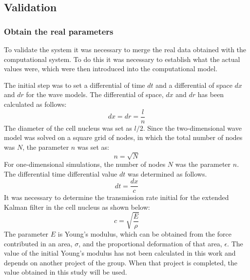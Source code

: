 \documentclass[12pt, a4paper]{article} %
\begin{document}
\setlength{\parskip}{0mm}

\subsection{Validation}

\subsubsection{Obtain the real parameters}

To validate the system it was necessary to merge the real data obtained with the computational system. To do this it was necessary to establish what the actual values were, which were then introduced into the computational model.

\setlength{\parskip}{4mm}

The initial step was to set a differential of time $dt$ and a differential of space $dx$ and $dr$ for the wave models. The differential of space, $dx$ and $dr$ has been calculated as follows:
\begin{equation} \label{eqn:dx}
	dx = dr = \frac{l}{n}
\end{equation}
The diameter of the cell nucleus was set as $l/2$. Since the two-dimensional wave model was solved on a square grid of nodes, in which the total number of nodes was $N$, the parameter $n$ was set as:
\begin{equation} \label{eqn:n}
	n = \sqrt{N}
\end{equation}
For one-dimensional simulations, the number of nodes $N$ was the parameter $n$. The differential time differential value $dt$ was determined as follows.
\begin{equation} \label{eqn:dt}
	dt = \frac{dx}{c}
\end{equation}
It was necessary to determine the transmission rate initial for the extended Kalman filter in the cell nucleus as shown below:
\begin{equation} \label{eqn:c}
	c = \sqrt{\frac{E}{\rho}}
\end{equation}
The parameter $E$ is Young's modulus, which can be obtained from the force contributed in an area, $\sigma$, and the proportional deformation of that area, $\epsilon$. The value of the initial Young's modulus has not been calculated in this work and depends on another project of the group. When that project is completed, the value obtained in this study will be used.
\end{document}
